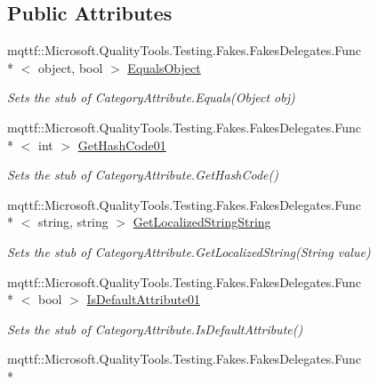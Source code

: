\subsection*{Public Attributes}
\begin{DoxyCompactItemize}
\item 
mqttf\-::\-Microsoft.\-Quality\-Tools.\-Testing.\-Fakes.\-Fakes\-Delegates.\-Func\\*
$<$ object, bool $>$ \hyperlink{class_system_1_1_component_model_1_1_fakes_1_1_stub_category_attribute_ab8af31add16b82f9374d4b8b4687bc50}{Equals\-Object}
\begin{DoxyCompactList}\small\item\em Sets the stub of Category\-Attribute.\-Equals(\-Object obj)\end{DoxyCompactList}\item 
mqttf\-::\-Microsoft.\-Quality\-Tools.\-Testing.\-Fakes.\-Fakes\-Delegates.\-Func\\*
$<$ int $>$ \hyperlink{class_system_1_1_component_model_1_1_fakes_1_1_stub_category_attribute_ac52de136ce0012515c82150dc51b3bb8}{Get\-Hash\-Code01}
\begin{DoxyCompactList}\small\item\em Sets the stub of Category\-Attribute.\-Get\-Hash\-Code()\end{DoxyCompactList}\item 
mqttf\-::\-Microsoft.\-Quality\-Tools.\-Testing.\-Fakes.\-Fakes\-Delegates.\-Func\\*
$<$ string, string $>$ \hyperlink{class_system_1_1_component_model_1_1_fakes_1_1_stub_category_attribute_ac4c694f830ead59f093b2b4eccbcef45}{Get\-Localized\-String\-String}
\begin{DoxyCompactList}\small\item\em Sets the stub of Category\-Attribute.\-Get\-Localized\-String(\-String value)\end{DoxyCompactList}\item 
mqttf\-::\-Microsoft.\-Quality\-Tools.\-Testing.\-Fakes.\-Fakes\-Delegates.\-Func\\*
$<$ bool $>$ \hyperlink{class_system_1_1_component_model_1_1_fakes_1_1_stub_category_attribute_a7bf6226bf8366283156f6b8339bd45bc}{Is\-Default\-Attribute01}
\begin{DoxyCompactList}\small\item\em Sets the stub of Category\-Attribute.\-Is\-Default\-Attribute()\end{DoxyCompactList}\item 
mqttf\-::\-Microsoft.\-Quality\-Tools.\-Testing.\-Fakes.\-Fakes\-Delegates.\-Func\\*

\end{DoxyCompactItemize}
